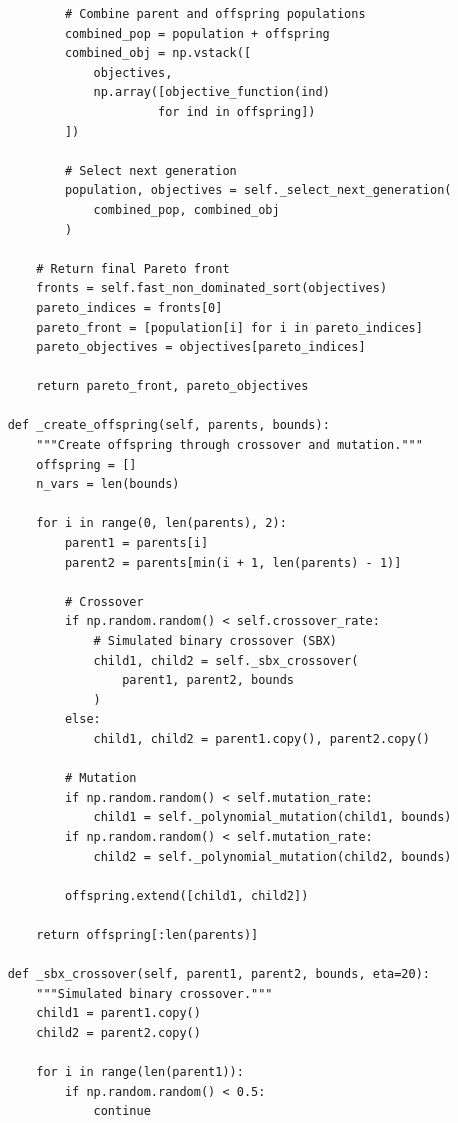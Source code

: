 \begin{lstlisting}
            # Combine parent and offspring populations
            combined_pop = population + offspring
            combined_obj = np.vstack([
                objectives,
                np.array([objective_function(ind) 
                         for ind in offspring])
            ])
            
            # Select next generation
            population, objectives = self._select_next_generation(
                combined_pop, combined_obj
            )
        
        # Return final Pareto front
        fronts = self.fast_non_dominated_sort(objectives)
        pareto_indices = fronts[0]
        pareto_front = [population[i] for i in pareto_indices]
        pareto_objectives = objectives[pareto_indices]
        
        return pareto_front, pareto_objectives
    
    def _create_offspring(self, parents, bounds):
        """Create offspring through crossover and mutation."""
        offspring = []
        n_vars = len(bounds)
        
        for i in range(0, len(parents), 2):
            parent1 = parents[i]
            parent2 = parents[min(i + 1, len(parents) - 1)]
            
            # Crossover
            if np.random.random() < self.crossover_rate:
                # Simulated binary crossover (SBX)
                child1, child2 = self._sbx_crossover(
                    parent1, parent2, bounds
                )
            else:
                child1, child2 = parent1.copy(), parent2.copy()
            
            # Mutation
            if np.random.random() < self.mutation_rate:
                child1 = self._polynomial_mutation(child1, bounds)
            if np.random.random() < self.mutation_rate:
                child2 = self._polynomial_mutation(child2, bounds)
            
            offspring.extend([child1, child2])
        
        return offspring[:len(parents)]
    
    def _sbx_crossover(self, parent1, parent2, bounds, eta=20):
        """Simulated binary crossover."""
        child1 = parent1.copy()
        child2 = parent2.copy()
        
        for i in range(len(parent1)):
            if np.random.random() < 0.5:
                continue
            

\end{lstlisting}
